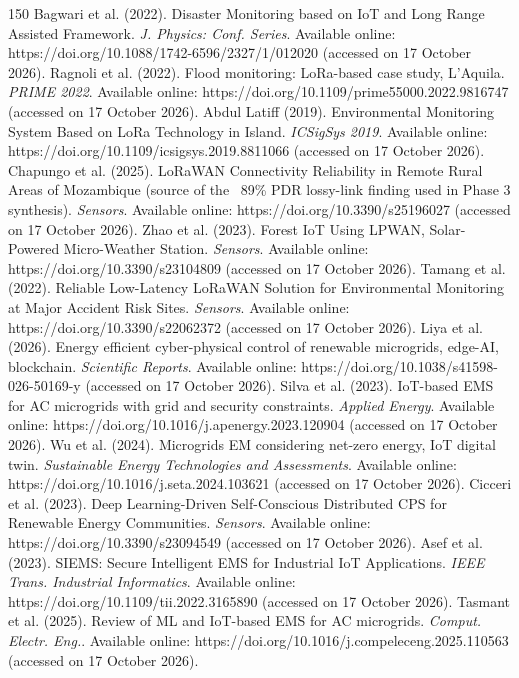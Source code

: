 \begin{thebibliography}{150}
Bagwari et al. (2022). Disaster Monitoring based on IoT and Long Range Assisted Framework. \textit{J. Physics: Conf. Series}. Available online: https://doi.org/10.1088/1742-6596/2327/1/012020 (accessed on 17 October 2026).
Ragnoli et al. (2022). Flood monitoring: LoRa-based case study, L'Aquila. \textit{PRIME 2022}. Available online: https://doi.org/10.1109/prime55000.2022.9816747 (accessed on 17 October 2026).
Abdul Latiff (2019). Environmental Monitoring System Based on LoRa Technology in Island. \textit{ICSigSys 2019}. Available online: https://doi.org/10.1109/icsigsys.2019.8811066 (accessed on 17 October 2026).
Chapungo et al. (2025). LoRaWAN Connectivity Reliability in Remote Rural Areas of Mozambique (source of the ~89\% PDR lossy-link finding used in Phase 3 synthesis). \textit{Sensors}. Available online: https://doi.org/10.3390/s25196027 (accessed on 17 October 2026).
Zhao et al. (2023). Forest IoT Using LPWAN, Solar-Powered Micro-Weather Station. \textit{Sensors}. Available online: https://doi.org/10.3390/s23104809 (accessed on 17 October 2026).
Tamang et al. (2022). Reliable Low-Latency LoRaWAN Solution for Environmental Monitoring at Major Accident Risk Sites. \textit{Sensors}. Available online: https://doi.org/10.3390/s22062372 (accessed on 17 October 2026).
Liya et al. (2026). Energy efficient cyber-physical control of renewable microgrids, edge-AI, blockchain. \textit{Scientific Reports}. Available online: https://doi.org/10.1038/s41598-026-50169-y (accessed on 17 October 2026).
Silva et al. (2023). IoT-based EMS for AC microgrids with grid and security constraints. \textit{Applied Energy}. Available online: https://doi.org/10.1016/j.apenergy.2023.120904 (accessed on 17 October 2026).
Wu et al. (2024). Microgrids EM considering net-zero energy, IoT digital twin. \textit{Sustainable Energy Technologies and Assessments}. Available online: https://doi.org/10.1016/j.seta.2024.103621 (accessed on 17 October 2026).
Cicceri et al. (2023). Deep Learning-Driven Self-Conscious Distributed CPS for Renewable Energy Communities. \textit{Sensors}. Available online: https://doi.org/10.3390/s23094549 (accessed on 17 October 2026).
Asef et al. (2023). SIEMS: Secure Intelligent EMS for Industrial IoT Applications. \textit{IEEE Trans. Industrial Informatics}. Available online: https://doi.org/10.1109/tii.2022.3165890 (accessed on 17 October 2026).
Tasmant et al. (2025). Review of ML and IoT-based EMS for AC microgrids. \textit{Comput. Electr. Eng.}. Available online: https://doi.org/10.1016/j.compeleceng.2025.110563 (accessed on 17 October 2026).

\end{thebibliography}
